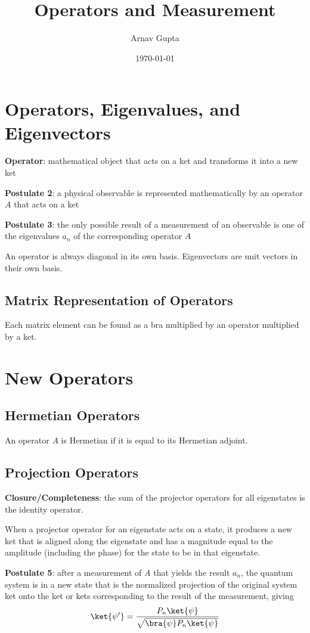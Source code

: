 \documentclass[11pt]{article}
\author{Arnav Gupta}
\date{\today}
\title{Operators and Measurement}
\begin{document}
\maketitle
\tableofcontents

\section{Operators, Eigenvalues, and Eigenvectors}
\label{sec:org6f6c1a8}
\textbf{Operator}: mathematical object that acts on a ket and transforms it into a new ket

\textbf{Postulate 2}: a physical observable is represented mathematically by an operator \(A\)
that acts on a ket

\textbf{Postulate 3}: the only possible result of a measurement of an observable is one of
the eigenvalues \(a_{n}\) of the corresponding operator \(A\)

An operator is always diagonal in its own basis.
Eigenvectors are unit vectors in their own basis.
\subsection{Matrix Representation of Operators}
\label{sec:org0dac4c4}
Each matrix element can be found as a bra multiplied by an operator multiplied by
a ket.
\section{New Operators}
\label{sec:org2109d70}
\subsection{Hermetian Operators}
\label{sec:orge73f16e}
An operator \(A\) is Hermetian if it is equal to its Hermetian adjoint.
\subsection{Projection Operators}
\label{sec:org4c0b7f5}
\textbf{Closure/Completeness}: the sum of the projector operators for all eigenstates is the identity operator.

When a projector operator for an eigenstate acts on a state, it produces a new ket that is aligned
along the eigenstate and has a magnitude equal to the amplitude (including the phase) for the
state to be in that eigenstate.

\textbf{Postulate 5}: after a measurement of \(A\) that yields the result \(a_{n}\), the quantum system
is in a new state that is the normalized projection of the original system ket onto the
ket or kets corresponding to the result of the measurement, giving
$$
        \ket{\psi '} = \frac{P_{n} \ket{\psi}}{\sqrt{\bra{\psi} P_{n} \ket{\psi}}}
$$
\end{document}
